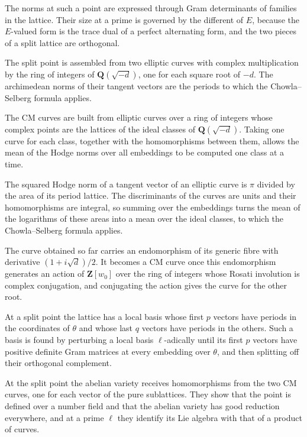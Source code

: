 The norms at such a point are expressed through Gram determinants of families in the lattice. Their
size at a prime is governed by the different of $E$, because the $E$-valued form is the trace dual
of a perfect alternating form, and the two pieces of a split lattice are orthogonal.

The split point is assembled from two elliptic curves with complex multiplication by the ring of
integers of $\mathbf Q(\sqrt{-d})$, one for each square root of $-d$. The archimedean norms of their
tangent vectors are the periods to which the Chowla--Selberg formula applies.

The CM curves are built from elliptic curves over a ring of integers whose complex points are the
lattices of the ideal classes of $\mathbf Q(\sqrt{-d})$. Taking one curve for each class, together with
the homomorphisms between them, allows the mean of the Hodge norms over all embeddings to be computed
one class at a time.

The squared Hodge norm of a tangent vector of an elliptic curve is $\pi$ divided by the area of its
period lattice. The discriminants of the curves are units and their homomorphisms are integral, so
summing over the embeddings turns the mean of the logarithms of these areas into a mean over the ideal
classes, to which the Chowla--Selberg formula applies.

The curve obtained so far carries an endomorphism of its generic fibre with derivative
$(1+i\sqrt d)/2$. It becomes a CM curve once this endomorphism generates an action of $\mathbf Z[w_0]$
over the ring of integers whose Rosati involution is complex conjugation, and conjugating the action
gives the curve for the other root.

At a split point the lattice has a local basis whose first $p$ vectors have periods in the coordinates
of $\theta$ and whose last $q$ vectors have periods in the others. Such a basis is found by perturbing a
local basis $\ell$-adically until its first $p$ vectors have positive definite Gram matrices at every
embedding over $\theta$, and then splitting off their orthogonal complement.

At the split point the abelian variety receives homomorphisms from the two CM curves, one for each
vector of the pure sublattices. They show that the point is defined over a number field and that the
abelian variety has good reduction everywhere, and at a prime $\ell$ they identify its Lie algebra with
that of a product of curves.

